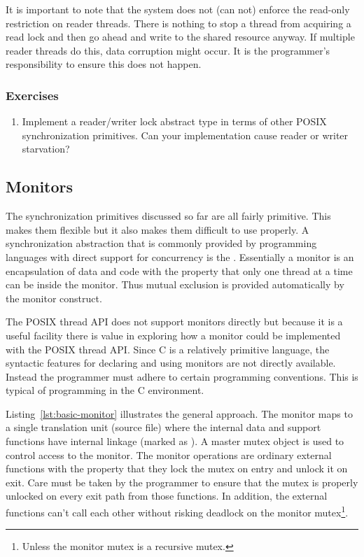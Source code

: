 It is important to note that the system does not (can not) enforce the read-only restriction on
reader threads. There is nothing to stop a thread from acquiring a read lock and then go ahead
and write to the shared resource anyway. If multiple reader threads do this, data corruption
might occur. It is the programmer's responsibility to ensure this does not happen.

\subsubsection*{Exercises}

\begin{enumerate}

\item Implement a reader/writer lock abstract type in terms of other POSIX synchronization
  primitives. Can your implementation cause reader or writer starvation?

\end{enumerate}

\subsection{Monitors}
\label{sec:monitors}

The synchronization primitives discussed so far are all fairly primitive. This makes them
flexible but it also makes them difficult to use properly. A synchronization abstraction that is
commonly provided by programming languages with direct support for concurrency is the
. Essentially a monitor is an encapsulation of data and code with the property
that only one thread at a time can be inside the monitor. Thus mutual exclusion is provided
automatically by the monitor construct.

The POSIX thread API does not support monitors directly but because it is a useful facility
there is value in exploring how a monitor could be implemented with the POSIX thread API. Since
C is a relatively primitive language, the syntactic features for declaring and using monitors
are not directly available. Instead the programmer must adhere to certain programming
conventions. This is typical of programming in the C environment.

Listing~\ref{lst:basic-monitor} illustrates the general approach. The monitor maps to a single
translation unit (source file) where the internal data and support functions have internal
linkage (marked as ). A master mutex object is used to control access to the
monitor. The monitor operations are ordinary external functions with the property that they lock
the mutex on entry and unlock it on exit. Care must be taken by the programmer to ensure that
the mutex is properly unlocked on every exit path from those functions. In addition, the
external functions can't call each other without risking deadlock on the monitor
mutex\footnote{Unless the monitor mutex is a recursive mutex.}.

